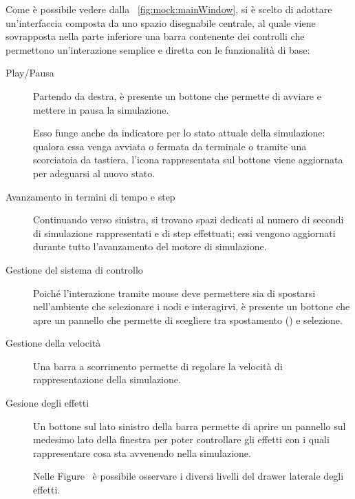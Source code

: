         Come è possibile vedere dalla \figurename~\vref{fig:mock:mainWindow}, si è scelto di adottare un'interfaccia composta da uno spazio disegnabile centrale, al quale viene sovrapposta nella parte inferiore una barra contenente dei controlli che permettono un'interazione semplice e diretta con le funzionalità di base:

        \begin{description}
          \item [Play/Pausa] Partendo da destra, è presente un bottone che permette di avviare e mettere in pausa la simulazione.

          Esso funge anche da indicatore per lo stato attuale della simulazione: qualora essa venga avviata o fermata da terminale o tramite una scorciatoia da tastiera, l'icona rappresentata sul bottone viene aggiornata per adeguarsi al nuovo stato.

          \item[Avanzamento in termini di tempo e step] Continuando verso sinistra, si trovano spazi dedicati al numero di secondi di simulazione rappresentati e di step effettuati; essi vengono aggiornati durante tutto l'avanzamento del motore di simulazione.

          \item[Gestione del sistema di controllo] Poiché l'interazione tramite mouse deve permettere sia di spostarsi nell'ambiente che selezionare i nodi e interagirvi, è presente un bottone che apre un pannello che permette di scegliere tra spostamento () e selezione.

          \item[Gestione della velocità] Una barra a scorrimento permette di regolare la velocità di rappresentazione della simulazione.

          \item[Gesione degli effetti] Un bottone sul lato sinistro della barra permette di aprire un pannello sul medesimo lato della finestra per poter controllare gli effetti con i quali rappresentare cosa sta avvenendo nella simulazione.

          Nelle Figure~ è possibile osservare i diversi livelli del drawer laterale degli effetti.


\end{description}
